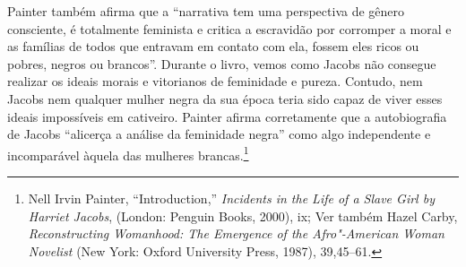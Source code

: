Painter também afirma que a ``narrativa tem uma perspectiva de gênero
consciente, é totalmente feminista e critica a escravidão por corromper
a moral e as famílias de todos que entravam em contato com ela, fossem
eles ricos ou pobres, negros ou brancos''. Durante o livro, vemos como
Jacobs não consegue realizar os ideais morais e vitorianos de feminidade
e pureza. Contudo, nem Jacobs nem qualquer mulher negra da sua época
teria sido capaz de viver esses ideais impossíveis em cativeiro. Painter
afirma corretamente que a autobiografia de Jacobs ``alicerça a análise
da feminidade negra'' como algo independente e incomparável àquela das
mulheres brancas.\footnote{Nell Irvin Painter, ``Introduction,''
  \emph{Incidents in the Life of a Slave Girl by Harriet Jacobs},
  (London: Penguin Books, 2000), ix; Ver também Hazel Carby,
  \emph{Reconstructing Womanhood: The Emergence of the Afro"-American
  Woman Novelist} (New York: Oxford University Press, 1987), 39,45--61.}

